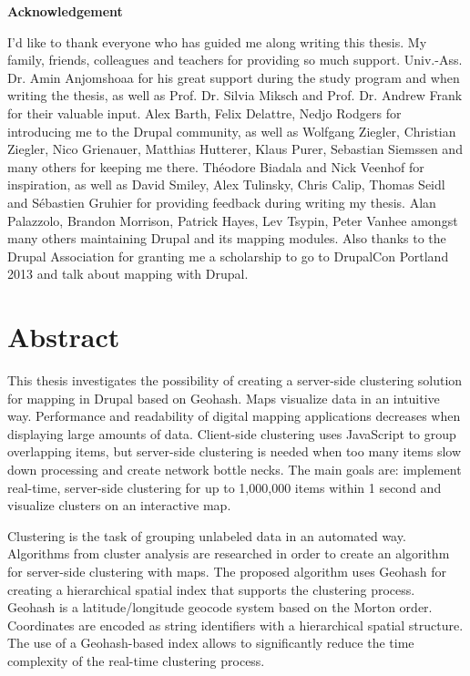 
%
%

\textbf{Acknowledgement}

I'd like to thank everyone who has guided me along writing this thesis. My family, friends, colleagues and teachers for providing so much support. Univ.-Ass. Dr. Amin Anjomshoaa for his great support during the study program and when writing the thesis, as well as Prof. Dr. Silvia Miksch and Prof. Dr. Andrew Frank for their valuable input. Alex Barth, Felix Delattre, Nedjo Rodgers for introducing me to the Drupal community, as well as Wolfgang Ziegler, Christian Ziegler, Nico Grienauer, Matthias Hutterer, Klaus Purer, Sebastian Siemssen and many others for keeping me there. Th\'eodore Biadala and Nick Veenhof for inspiration, as well as David Smiley, Alex Tulinsky, Chris Calip, Thomas Seidl and S\'ebastien Gruhier for providing feedback during writing my thesis. Alan Palazzolo, Brandon Morrison, Patrick Hayes, Lev Tsypin, Peter Vanhee amongst many others maintaining Drupal and its mapping modules. Also thanks to the Drupal Association for granting me a scholarship to go to DrupalCon Portland 2013 and talk about mapping with Drupal. 


\chapter*{Abstract}

This thesis investigates the possibility of creating a server-side clustering solution for mapping in Drupal based on Geohash. Maps visualize data in an intuitive way. Performance and readability of digital mapping applications decreases when displaying large amounts of data. Client-side clustering uses JavaScript to group overlapping items, but server-side clustering is needed when too many items slow down processing and create network bottle necks. The main goals are: implement real-time, server-side clustering for up to 1,000,000 items within 1 second and visualize clusters on an interactive map.

Clustering is the task of grouping unlabeled data in an automated way. Algorithms from cluster analysis are researched in order to create an algorithm for server-side clustering with maps. The proposed algorithm uses Geohash for creating a hierarchical spatial index that supports the clustering process. Geohash is a latitude/longitude geocode system based on the Morton order. Coordinates are encoded as string identifiers with a hierarchical spatial structure. The use of a Geohash-based index allows to significantly reduce the time complexity of the real-time clustering process.

